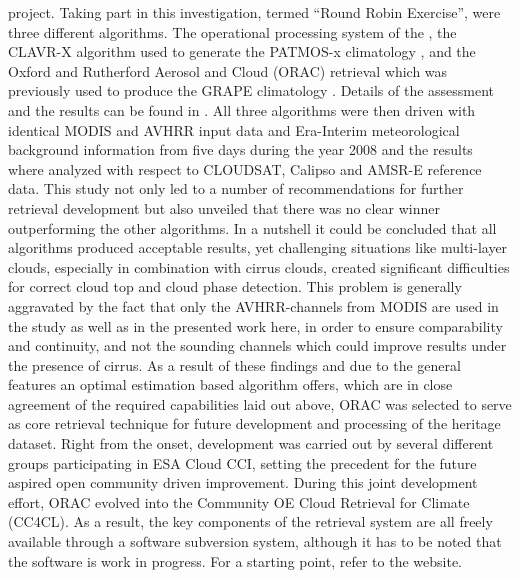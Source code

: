 project.
Taking part in this investigation, termed ``Round Robin Exercise'',
were three different algorithms. The operational processing system of the
\citet{CMSAF_web}, the CLAVR-X algorithm used to generate the PATMOS-x
climatology \citep{Heidinger13}, and the Oxford and Rutherford Aerosol and
Cloud (ORAC) retrieval \citep{Thomas09, Poulsen12} which was previously used
to produce the GRAPE climatology \citep{Thomas09_GRAPE, GRAPE_web}.
Details of the assessment and the results can be found in
\citet{Stengel15}. All three algorithms were then driven with identical MODIS
and AVHRR input data and Era-Interim meteorological background information
from five days during the year 2008 and the results where analyzed with
respect to CLOUDSAT, Calipso and AMSR-E reference data.
This study not only led to a number of recommendations for further retrieval
development but also unveiled that there was no clear winner outperforming the
other algorithms. 
In a nutshell it could be concluded that all algorithms produced acceptable
results, yet challenging situations like multi-layer clouds, especially in
combination with cirrus clouds, created significant difficulties for correct
cloud top and cloud phase detection. 
This problem is generally aggravated by the fact that only the AVHRR-channels from
MODIS are used in the study as well as in the presented work here, in order to
ensure comparability and continuity, and not the sounding channels which could
improve results under the presence of cirrus.
As a result of these findings and due to the general features an optimal
estimation based algorithm offers, which are in close agreement of the
required capabilities laid out above, ORAC was selected to serve as core
retrieval technique for future development and processing of the heritage
dataset.
Right from the onset, development was carried out by several
different groups participating in ESA Cloud CCI, setting the precedent for the
future aspired open community driven improvement.
During this joint development effort, ORAC evolved into the Community OE Cloud
Retrieval for Climate (CC4CL).
As a result, the key components of the retrieval system are
all freely available through a software subversion system, although it has to
be noted that the software is work in progress. 
For a starting point, refer to the
\citet{ORAC_web} website.

